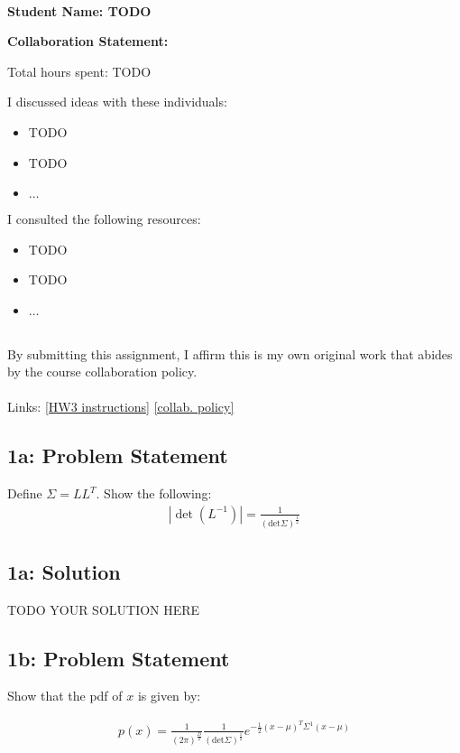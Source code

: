 \documentclass[10pt]{article}
\newcommand{\officialdirections}[1]{{\color{purple} #1}}
\begin{document}
~~\\ %

{\Large{\bf Student Name: TODO}}

\Large{\bf Collaboration Statement:}

Total hours spent: TODO

I discussed ideas with these individuals:
\begin{itemize}
\item TODO
\item TODO
\item $\ldots$	
\end{itemize}

I consulted the following resources:
\begin{itemize}
\item TODO
\item TODO
\item $\ldots$	
\end{itemize}
~~\\
By submitting this assignment, I affirm this is my own original work that abides by the course collaboration policy.
~~\\
~~\\
Links: 
\href{https://www.cs.tufts.edu/cs/136/2024s/hw3.html}{[HW3 instructions]} 
\href{https://www.cs.tufts.edu/cs/136/2024s/index.html#collaboration}{[collab. policy]} 

\tableofcontents

\newpage

\officialdirections{
\subsection*{1a: Problem Statement}
Define $\Sigma = L L^T$. Show the following:
\begin{align}
| \det (L^{-1}) | = \frac{1}{(\text{det} \Sigma)^{\frac{1}{2}}}
\end{align}
}

\subsection{1a: Solution}
TODO YOUR SOLUTION HERE


\officialdirections{
\subsection*{1b: Problem Statement}
Show that the pdf of $x$ is given by:

\begin{align}
p(x) = \frac{1}{(2\pi)^{\frac{D}{2}}}
\frac{1}{(\text{det} \Sigma)^{\frac{1}{2}}}
e^{-\frac{1}{2} (x-\mu)^T \Sigma^{1} (x-\mu)}
\end{align}
}
\end{document}

